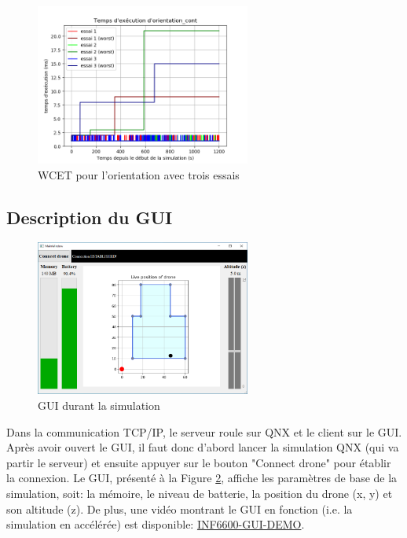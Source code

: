 \documentclass[journal]{IEEEtran}
\begin{document}
\begin{figure}
	\centering
	\captionsetup{justification=centering}
	\includegraphics[width=200pt]{orientation_cont.png}
	\caption{WCET pour l'orientation avec trois essais}
	\label{fig:perfoOrientation}
\end{figure}

\subsection{Description du GUI}

\begin{figure}
	\centering
	\captionsetup{justification=centering}
	\includegraphics[width=200pt]{GUI_image.png}
	\caption{GUI durant la simulation}
	\label{fig:GUI}
\end{figure}

Dans la communication TCP/IP, le serveur roule sur QNX et le client sur le GUI. Après avoir ouvert le GUI, il faut donc d'abord lancer la simulation QNX (qui va partir le serveur) et ensuite appuyer sur le bouton "Connect drone" pour établir la connexion. Le GUI, présenté à la Figure \ref{fig:GUI}, affiche les paramètres de base de la simulation, soit: la mémoire, le niveau de batterie, la position du drone (x, y) et son altitude (z). De plus, une vidéo montrant le GUI en fonction (i.e. la simulation en accélérée) est disponible: \href{https://drive.google.com/file/d/1W9yt0Z4YxCwr0TjXkgv12WVO9TSmWGtv/view?usp=sharing}{INF6600-GUI-DEMO}\cite{ref:video}.
\end{document}
